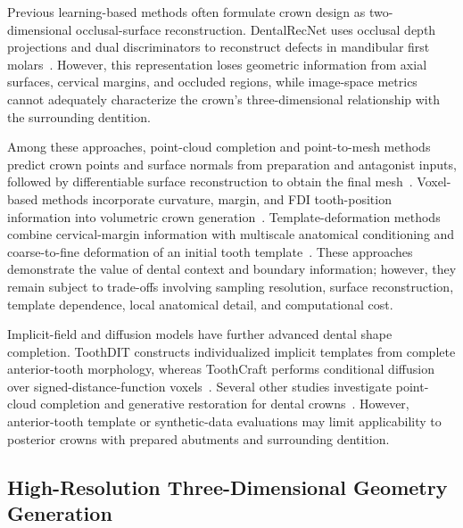 \documentclass[preprint,review,12pt]{elsarticle}
\begin{document}
\hspace{2em}Previous learning-based methods often formulate crown design as two-dimensional occlusal-surface reconstruction. DentalRecNet uses occlusal depth projections and dual discriminators to reconstruct defects in mandibular first molars~\cite{Tian2022DentalRecNet}. However, this representation loses geometric information from axial surfaces, cervical margins, and occluded regions, while image-space metrics cannot adequately characterize the crown's three-dimensional relationship with the surrounding dentition.

\hspace{2em}Among these approaches, point-cloud completion and point-to-mesh methods predict crown points and surface normals from preparation and antagonist inputs, followed by differentiable surface reconstruction to obtain the final mesh~\cite{Yang2025DCrownFormerPlus}. Voxel-based methods incorporate curvature, margin, and FDI tooth-position information into volumetric crown generation~\cite{Wei2025VBCD}. Template-deformation methods combine cervical-margin information with multiscale anatomical conditioning and coarse-to-fine deformation of an initial tooth template~\cite{Wei2026MADCrowner}. These approaches demonstrate the value of dental context and boundary information; however, they remain subject to trade-offs involving sampling resolution, surface reconstruction, template dependence, local anatomical detail, and computational cost.

\hspace{2em}Implicit-field and diffusion models have further advanced dental shape completion. ToothDIT constructs individualized implicit templates from complete anterior-tooth morphology, whereas ToothCraft performs conditional diffusion over signed-distance-function voxels~\cite{Pukanec2026ToothCraft}. Several other studies investigate point-cloud completion and generative restoration for dental crowns~\cite{Chanintonsongkhla2025PointFlow,Ying2026Tooth3dNet,Shu2026AIDrivenCrown,Zhao2026ToothGAN,tian2026DM-CFO}. However, anterior-tooth template or synthetic-data evaluations may limit applicability to posterior crowns with prepared abutments and surrounding dentition.

\subsection{High-Resolution Three-Dimensional Geometry Generation}\label{subsec2_2}
\end{document}
